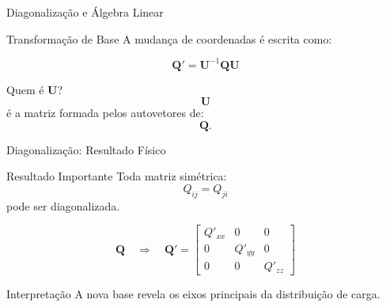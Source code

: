 \documentclass[aspectratio=169]{beamer}
\begin{document}
\begin{frame}{Diagonalização e Álgebra Linear}

\begin{mybox}{Transformação de Base}
A mudança de coordenadas é escrita como:
\end{mybox}

\begin{eqbox}
\begin{equation}
\mathbf Q'
=
\mathbf U^{-1}
\mathbf Q
\mathbf U
\tag{4.59}
\end{equation}
\end{eqbox}

\begin{mybox}{Quem é \(\mathbf U\)?}
\[
\mathbf U
\]
é a matriz formada pelos autovetores de:
\[
\mathbf Q.
\]
\end{mybox}

\end{frame}

\begin{frame}{Diagonalização: Resultado Físico}

\begin{alertblock}{Resultado Importante}
Toda matriz simétrica:
\[
Q_{ij}=Q_{ji}
\]
pode ser diagonalizada.
\end{alertblock}

\begin{center}
\Large
\[
\mathbf Q
\quad
\Longrightarrow
\quad
\mathbf Q'
=
\begin{bmatrix}
Q'_{xx} & 0 & 0
\\
0 & Q'_{yy} & 0
\\
0 & 0 & Q'_{zz}
\end{bmatrix}
\]
\end{center}

\begin{mybox}{Interpretação}
A nova base revela os eixos principais da distribuição de carga.
\end{mybox}

\end{frame}
\end{document}
